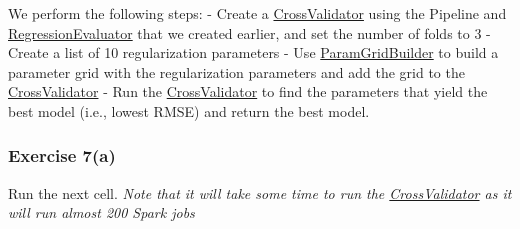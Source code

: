 \documentclass[11pt]{article}
\begin{document}
We perform the following steps: - Create a
\href{https://spark.apache.org/docs/latest/api/python/reference/api/pyspark.ml.tuning.CrossValidator.html\#pyspark.ml.tuning.CrossValidator}{CrossValidator}
using the Pipeline and
\href{https://spark.apache.org/docs/latest/api/python/reference/api/pyspark.ml.evaluation.RegressionEvaluator.html?highlight=regressionevaluator\#pyspark.ml.evaluation.RegressionEvaluator}{RegressionEvaluator}
that we created earlier, and set the number of folds to 3 - Create a
list of 10 regularization parameters - Use
\href{https://spark.apache.org/docs/latest/api/python/reference/api/pyspark.ml.tuning.ParamGridBuilder.html?highlight=paramgridbuilder\#pyspark.ml.tuning.ParamGridBuilder}{ParamGridBuilder}
to build a parameter grid with the regularization parameters and add the
grid to the
\href{https://spark.apache.org/docs/latest/api/python/reference/api/pyspark.ml.tuning.CrossValidator.html\#pyspark.ml.tuning.CrossValidator}{CrossValidator}
- Run the
\href{https://spark.apache.org/docs/latest/api/python/reference/api/pyspark.ml.tuning.CrossValidator.html\#pyspark.ml.tuning.CrossValidator}{CrossValidator}
to find the parameters that yield the best model (i.e., lowest RMSE) and
return the best model.

\hypertarget{exercise-7a}{%
\subsubsection{Exercise 7(a)}\label{exercise-7a}}

Run the next cell. \emph{Note that it will take some time to run the
\href{https://spark.apache.org/docs/latest/api/python/reference/api/pyspark.ml.tuning.CrossValidator.html\#pyspark.ml.tuning.CrossValidator}{CrossValidator}
as it will run almost 200 Spark jobs}
\end{document}
